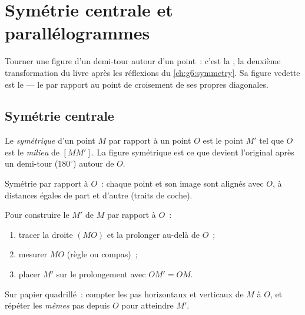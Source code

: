 \chapter{Symétrie centrale et parallélogrammes}\label{ch:g7:central}

Tourner une figure d'un demi-tour autour d'un point~: c'est la
\emph{}, la deuxième transformation du livre après
les réflexions du \cref{ch:g6:symmetry}. Sa figure vedette est le
 --- le   par rapport au point
de croisement de ses propres diagonales.

\section{Symétrie centrale}

\begin{definition}\label{def:g7:central:def}
Le \emph{symétrique} d'un point $M$ par
rapport à un point $O$ est le point $M'$ tel que $O$ est le
\emph{milieu} de $[MM']$. La figure symétrique est ce que devient
l'original après un demi-tour ($180^\circ$) autour de $O$.
\end{definition}

\begin{omfigure}

{\small Symétrie par rapport à $O$~: chaque point et son image sont
alignés avec $O$, à distances égales de part et d'autre (traits de
coche).}
\end{omfigure}

\begin{method}\label{met:g7:central:construct}
Pour construire le  $M'$ de $M$ par rapport à $O$~:
\begin{enumerate}
  \item tracer la droite $(MO)$ et la prolonger au-delà de $O$~;
  \item mesurer $MO$ (règle ou compas)~;
  \item placer $M'$ sur le prolongement avec $OM' = OM$.
\end{enumerate}
Sur papier quadrillé~: compter les pas horizontaux et verticaux de
$M$ à $O$, et répéter les \emph{mêmes} pas depuis $O$ pour atteindre
$M'$.
\end{method}

